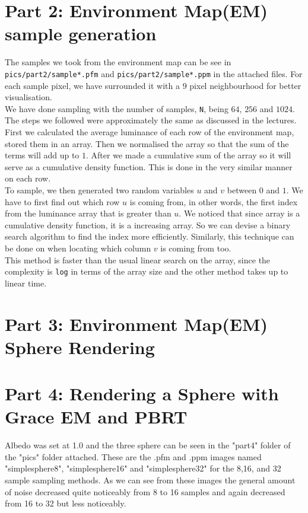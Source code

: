 \documentclass{article}
\begin{document}
\section{Part 2: Environment Map(EM) sample generation}
The samples we took from the environment map can be see in 
\texttt{pics/part2/sample*.pfm} and \texttt{pics/part2/sample*.ppm} in the 
attached files. For each sample pixel, we have surrounded it with a $9$ pixel 
neighbourhood for better visualisation. 
\\
We have done sampling with the number of samples, \texttt{N}, being $64$, $256$
and $1024$. The steps we followed were approximately the same as discussed in the
lectures. First we calculated the average luminance of each row of the environment
map, stored them in an array. Then we normalised the array so that the sum of the 
terms will add up to $1$. After we made a cumulative sum of the array so it will 
serve as a cumulative density function. This is done in the very similar manner
on each row.\\
To sample, we then generated two random variables $u$ and $v$ between $0$ and $1$.
We have to first find out which row $u$ is coming from, in other words, the first
index from the luminance array that is greater than $u$. We noticed that since
array is a cumulative density function, it is a increasing array. So we can 
devise a binary search algorithm to find the index more efficiently. Similarly, this 
technique can be done on when locating which column $v$ is coming from too.\\
This method is faster than the usual linear search on the array, since the complexity
is \texttt{log} in terms of the array size and the other method takes up to 
linear time.

\section{Part 3: Environment Map(EM) Sphere Rendering}



\section{Part 4: Rendering a Sphere with Grace EM and PBRT}
Albedo was set at 1.0 and the three sphere can be seen in the
"part4" folder of the "pics" folder attached. These are the
.pfm and .ppm images named "simplesphere8", 
"simplesphere16" and "simplesphere32" for the 8,16, and
32 sample sampling methods.
As we can see from these images the general amount of noise 
decreased quite noticeably from 8 to 16 samples and again 
decreased from 16 to 32 but less noticeably.
\end{document}
